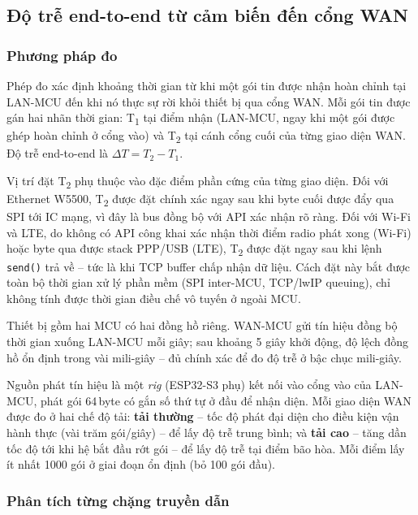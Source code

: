 \subsection{Độ trễ end-to-end từ cảm biến đến cổng WAN}
\label{subsec:bench_e2e}

\subsubsection{Phương pháp đo}

Phép đo xác định khoảng thời gian từ khi một gói tin được nhận hoàn chỉnh tại LAN-MCU đến khi nó thực sự rời khỏi thiết bị qua cổng WAN. Mỗi gói tin được gán hai nhãn thời gian: T\textsubscript{1} tại điểm nhận (LAN-MCU, ngay khi một gói được ghép hoàn chỉnh ở cổng vào) và T\textsubscript{2} tại cánh cổng cuối của từng giao diện WAN. Độ trễ end-to-end là $\Delta T = T_2 - T_1$.

Vị trí đặt T\textsubscript{2} phụ thuộc vào đặc điểm phần cứng của từng giao diện. Đối với Ethernet W5500, T\textsubscript{2} được đặt chính xác ngay sau khi byte cuối được đẩy qua SPI tới IC mạng, vì đây là bus đồng bộ với API xác nhận rõ ràng. Đối với Wi-Fi và LTE, do không có API công khai xác nhận thời điểm radio phát xong (Wi-Fi) hoặc byte qua được stack PPP/USB (LTE), T\textsubscript{2} được đặt ngay sau khi lệnh \texttt{send()} trả về -- tức là khi TCP buffer chấp nhận dữ liệu. Cách đặt này bắt được toàn bộ thời gian xử lý phần mềm (SPI inter-MCU, TCP/lwIP queuing), chỉ không tính được thời gian điều chế vô tuyến ở ngoài MCU.

Thiết bị gồm hai MCU có hai đồng hồ riêng. WAN-MCU gửi tín hiệu đồng bộ thời gian xuống LAN-MCU mỗi giây; sau khoảng 5 giây khởi động, độ lệch đồng hồ ổn định trong vài mili-giây -- đủ chính xác để đo độ trễ ở bậc chục mili-giây.

Nguồn phát tín hiệu là một \textit{rig} (ESP32-S3 phụ) kết nối vào cổng vào của LAN-MCU, phát gói 64\,byte có gắn số thứ tự ở đầu để nhận diện. Mỗi giao diện WAN được đo ở hai chế độ tải: \textbf{tải thường} -- tốc độ phát đại diện cho điều kiện vận hành thực (vài trăm gói/giây) -- để lấy độ trễ trung bình; và \textbf{tải cao} -- tăng dần tốc độ tới khi hệ bắt đầu rớt gói -- để lấy độ trễ tại điểm bão hòa. Mỗi điểm lấy ít nhất 1000 gói ở giai đoạn ổn định (bỏ 100 gói đầu).

\subsubsection{Phân tích từng chặng truyền dẫn}

